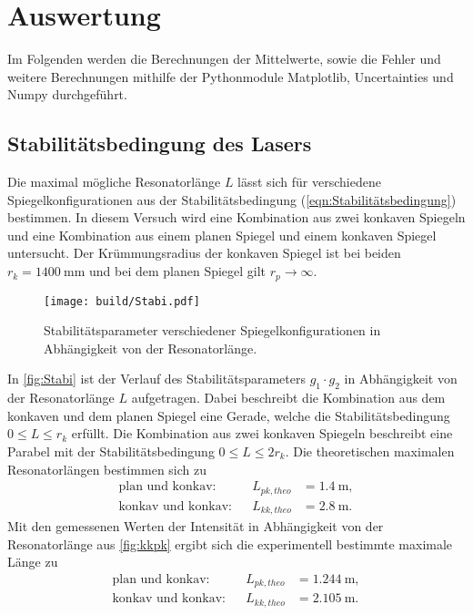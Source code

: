 \section{Auswertung}
\label{sec:Auswertung}

Im Folgenden werden die Berechnungen der Mittelwerte, sowie die Fehler und weitere Berechnungen mithilfe der Pythonmodule Matplotlib\cite{matplotlib},
Uncertainties\cite{uncertainties} und Numpy\cite{numpy} durchgeführt.

\subsection{Stabilitätsbedingung des Lasers}
\label{subsec:Stabilitätsbedingung}
Die maximal mögliche Resonatorlänge $L$ lässt sich für verschiedene Spiegelkonfigurationen aus der Stabilitätsbedingung (\autoref{eqn:Stabilitätsbedingung})
bestimmen. In diesem Versuch wird eine Kombination aus zwei konkaven Spiegeln und eine Kombination aus einem planen Spiegel und einem konkaven
Spiegel untersucht.
Der Krümmungsradius der konkaven Spiegel ist bei beiden $r_k = \qty{1400}{\milli\meter}$ und bei dem planen Spiegel gilt $r_p \to \infty$.

\begin{figure}[H]
  \centering
  \texttt{[image: build/Stabi.pdf]}
  \caption {Stabilitätsparameter verschiedener Spiegelkonfigurationen in Abhängigkeit von der Resonatorlänge.}
  \label{fig:Stabi}
\end{figure}

In \autoref{fig:Stabi} ist der Verlauf des Stabilitätsparameters $g_1 \cdot g_2$ in Abhängigkeit von der Resonatorlänge $L$ aufgetragen. Dabei beschreibt die
Kombination aus dem konkaven und dem planen Spiegel eine Gerade, welche die Stabilitätsbedingung $0 \leq L \leq r_k$ erfüllt. Die Kombination aus zwei konkaven Spiegeln
beschreibt eine Parabel mit der Stabilitätsbedingung $0 \leq L \leq 2 r_k$.
Die theoretischen maximalen Resonatorlängen bestimmen sich zu
\begin{align*}
  \text{plan und konkav:} && L_{pk,theo} &= \qty{1.4}{\meter},\\
  \text{konkav und konkav:}&& L_{kk,theo} & = \qty{2.8}{\meter}.
\end{align*}
Mit den gemessenen Werten der Intensität in Abhängigkeit von der Resonatorlänge aus \autoref{fig:kkpk} ergibt sich die experimentell
bestimmte maximale Länge zu
\begin{align*}
  \text{plan und konkav:} && L_{pk,theo} &= \qty{1.244}{\meter},\\
  \text{konkav und konkav:}&& L_{kk,theo} & = \qty{2.105}{\meter}.
\end{align*}


